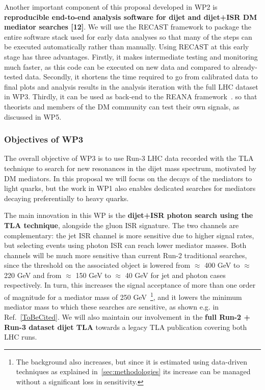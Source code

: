 Another important component of this proposal developed in WP2 is \textbf{reproducible end-to-end analysis software for dijet and dijet+ISR DM mediator searches [12]}. 
We will use the RECAST framework to package the entire software stack used for early data analyses so that many of the steps can be executed automatically rather than manually.
Using RECAST at this early stage has three advantages. 
Firstly, it makes intermediate testing and monitoring much faster, as this code can be executed on new data and compared to already-tested data. 
Secondly, it shortens the time required to go from calibrated data to final plots and analysis results in the analysis iteration with the full LHC dataset in WP3.
Thirdly, it can be used as back-end to the REANA framework~\cite{ToBeCited}. %
so that theorists and members of the DM community can test their own signals, as discussed in WP5.  

\subsubsection{Objectives of WP3}

The overall objective of WP3 is to use Run-3 LHC data recorded with the TLA technique to search for new resonances in the dijet mass spectrum, motivated by DM mediators.
In this proposal we will focus on the decays of the mediators to light quarks, but the work in WP1 also enables dedicated searches for mediators decaying preferentially to heavy quarks. 

The main innovation in this WP is the \textbf{dijet+ISR photon search using the TLA technique}, alongside the gluon ISR signature. 
The two channels are complementary: the jet ISR channel is more sensitive due to higher signal rates, but selecting events using photon ISR can reach lower mediator masses. 
Both channels will be much more sensitive than current Run-2 traditional searches, since the threshold on the associated object is lowered from $\approx$ 400 GeV to $\approx$ 220 GeV and from $\approx$ 150 GeV to $\approx$ 40 GeV for jet and photon cases respectively.  
In turn, this increases the signal acceptance of more than one order of magnitude for a mediator mass of 250 GeV~\footnote{The background also increases, but since it is estimated using data-driven techniques as explained in~\ref{sec:methodologies} its increase can be managed without a significant loss in sensitivity.}, 
and it lowers the minimum mediator mass to which these searches are sensitive, as shown e.g. in Ref.~\ref{ToBeCited}.%
We will also maintain our involvement in the \textbf{full Run-2 + Run-3 dataset dijet TLA} towards a legacy TLA publication covering both LHC runs.

